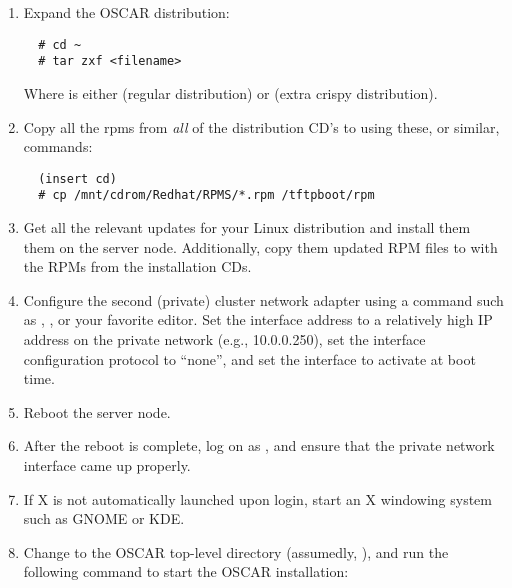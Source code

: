 \begin {enumerate}
\item Expand the OSCAR distribution:

\begin{verbatim}
  # cd ~
  # tar zxf <filename>
\end{verbatim}
  
  Where  is either
   (regular distribution) or
   (extra crispy
    distribution).


\item Copy all the rpms from \emph{all} of the distribution CD's to
   using these, or similar, commands:

\begin{verbatim}
  (insert cd)
  # cp /mnt/cdrom/Redhat/RPMS/*.rpm /tftpboot/rpm
\end{verbatim}


\item Get all the relevant updates for your Linux distribution and
  install them them on the server node.  Additionally, copy them
  updated RPM files to  with the RPMs from the
  installation CDs.
  
  
\item Configure the second (private) cluster network adapter using a
  command such as , , or your favorite editor.
  Set the interface address to a relatively high IP address on the
  private network (e.g., 10.0.0.250), set the interface configuration
  protocol to ``none'', and set the interface to activate at boot
  time.


\item Reboot the server node.  
  
\item After the reboot is complete, log on as , and ensure
  that the private network interface came up properly.
  
\item If X is not automatically launched upon  login, start
  an X windowing system such as GNOME or KDE.
  
\item Change to the OSCAR top-level directory (assumedly,
  ), and run the following
  command to start the OSCAR installation:


\end{enumerate}
